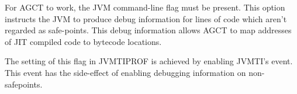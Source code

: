 For AGCT to work, the JVM command-line flag  must be present. This option instructs the JVM to produce debug information for lines of code which aren't regarded as safe-points. This debug information allows AGCT to map addresses of JIT compiled code to bytecode locations.

The setting of this flag in JVMTIPROF is achieved by enabling JVMTI's  event. This event has the side-effect of enabling debugging information on non-safepoints. 



